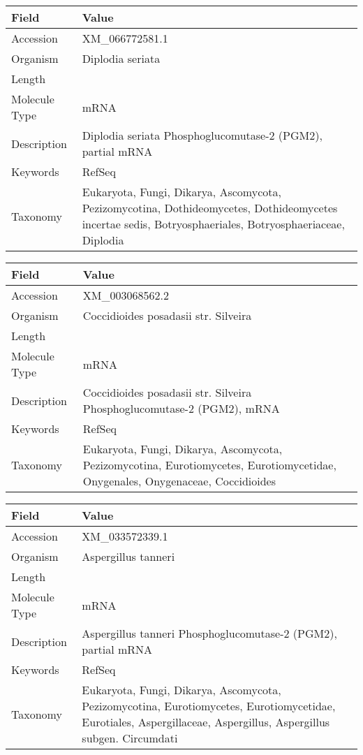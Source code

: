 \documentclass[10pt]{article}
\begin{document}
{\footnotesize
\begin{longtable}{>{\raggedright\arraybackslash}p{4.5cm} >{\raggedright\arraybackslash}p{11.5cm}}
\textbf{Field} & \textbf{Value} \\
\hline
Accession & XM\_066772581.1 \\
Organism & Diplodia seriata \\
Length & 1719 \\
Molecule Type & mRNA \\
Description & Diplodia seriata Phosphoglucomutase-2 (PGM2), partial mRNA \\
Keywords & RefSeq \\
Taxonomy & Eukaryota, Fungi, Dikarya, Ascomycota, Pezizomycotina, Dothideomycetes, Dothideomycetes incertae sedis, Botryosphaeriales, Botryosphaeriaceae, Diplodia \\
\end{longtable}
}

{\footnotesize
\begin{longtable}{>{\raggedright\arraybackslash}p{4.5cm} >{\raggedright\arraybackslash}p{11.5cm}}
\textbf{Field} & \textbf{Value} \\
\hline
Accession & XM\_003068562.2 \\
Organism & Coccidioides posadasii str. Silveira \\
Length & 3828 \\
Molecule Type & mRNA \\
Description & Coccidioides posadasii str. Silveira Phosphoglucomutase-2 (PGM2), mRNA \\
Keywords & RefSeq \\
Taxonomy & Eukaryota, Fungi, Dikarya, Ascomycota, Pezizomycotina, Eurotiomycetes, Eurotiomycetidae, Onygenales, Onygenaceae, Coccidioides \\
\end{longtable}
}

{\footnotesize
\begin{longtable}{>{\raggedright\arraybackslash}p{4.5cm} >{\raggedright\arraybackslash}p{11.5cm}}
\textbf{Field} & \textbf{Value} \\
\hline
Accession & XM\_033572339.1 \\
Organism & Aspergillus tanneri \\
Length & 1668 \\
Molecule Type & mRNA \\
Description & Aspergillus tanneri Phosphoglucomutase-2 (PGM2), partial mRNA \\
Keywords & RefSeq \\
Taxonomy & Eukaryota, Fungi, Dikarya, Ascomycota, Pezizomycotina, Eurotiomycetes, Eurotiomycetidae, Eurotiales, Aspergillaceae, Aspergillus, Aspergillus subgen. Circumdati \\
\end{longtable}
}
\end{document}
